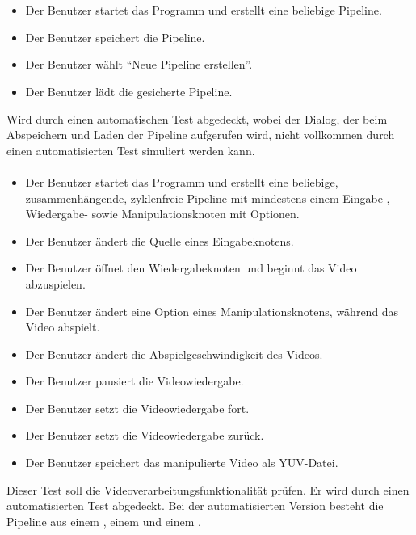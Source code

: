 \paragraph{} ~\\

\begin{itemize}
	\item Der Benutzer startet das Programm und erstellt eine beliebige Pipeline.
	\item Der Benutzer speichert die Pipeline.
	\item Der Benutzer wählt ``Neue Pipeline erstellen''.
	\item Der Benutzer lädt die gesicherte Pipeline.
\end{itemize}

Wird durch einen automatischen Test abgedeckt, wobei der Dialog, der beim Abspeichern und Laden der Pipeline aufgerufen wird, nicht vollkommen durch einen automatisierten Test simuliert werden kann.

\paragraph{}

\begin{itemize}
	\item Der Benutzer startet das Programm und erstellt eine beliebige, zusammenhängende, zyklenfreie Pipeline mit mindestens einem Eingabe-, Wiedergabe- sowie Manipulationsknoten mit Optionen.
	\item Der Benutzer ändert die Quelle eines Eingabeknotens.
	\item Der Benutzer öffnet den Wiedergabeknoten und beginnt das Video abzuspielen.
	\item Der Benutzer ändert eine Option eines Manipulationsknotens, während das Video abspielt.
	\item Der Benutzer ändert die Abspielgeschwindigkeit des Videos.
	\item Der Benutzer pausiert die Videowiedergabe.
	\item Der Benutzer setzt die Videowiedergabe fort.
	\item Der Benutzer setzt die Videowiedergabe zurück.
	\item Der Benutzer speichert das manipulierte Video als YUV-Datei.
\end{itemize}

Dieser Test soll die Videoverarbeitungsfunktionalität prüfen. Er wird durch einen automatisierten Test abgedeckt. Bei der automatisierten Version besteht die Pipeline aus einem , einem  und einem .

